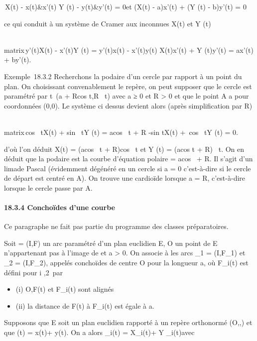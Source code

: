 \documentclass[]{article}
\begin{document}
\left
\matrix\,X(t) - x(t)&x'(t)
\cr Y (t) - y(t)&y'(t)\right 
= 0\text et (X(t) - a)x'(t) + (Y (t) - b)y'(t) = 0

ce qui conduit à un système de Cramer aux inconnues X(t) et Y (t)

\left
\\matrix\,y'(t)X(t) -
x'(t)Y (t) = y'(t)x(t) - x'(t)y(t) \cr X(t)x'(t) + Y
(t)y'(t) = ax'(t) + by'(t)\right .

Exemple~18.3.2 Recherchons la podaire d'un cercle par rapport à un point
du plan. On choisissant convenablement le repère, on peut supposer que
le cercle est paramétré par t\mapsto~(a +
Rcos t,R\sin~ t) avec
a ≥ 0 et R > 0 et que le point A a pour coordonnées (0,0).
Le système ci dessus devient alors (après simplification par R)

\left
\\matrix\,cos~
tX(t) + sin~ tY (t) =
acos~ t + R \cr
-sin tX(t) +\ cos~ tY
(t) = 0\right .

d'où l'on déduit X(t) = (acos~ t +
R)cos~ t et Y (t) =
(acos t + R)\sin~ t.
On en déduit que la podaire est la courbe d'équation polaire \rho =
acos~ \theta + R. Il s'agit d'un
lima\ccon de Pascal (évidemment dégénéré en un cercle
si a = 0 c'est-à-dire si le cercle de départ est centré en A). On trouve
une cardioïde lorsque a = R, c'est-à-dire lorsque le cercle passe par A.

\paragraph{18.3.4 Conchoïdes d'une courbe}

Ce paragraphe ne fait pas partie du programme des classes préparatoires.

Soit \Gamma = (I,F) un arc paramétré d'un plan euclidien E, O un point de E
n'appartenant pas à l'image de \Gamma et a > 0. On associe à \Gamma
les arcs \Gamma_1 = (I,F_1) et \Gamma_2 =
(I,F_2), appelés conchoïdes de centre O pour la longueur a, où
F_i(t) est défini pour i
\in\1,2\ par

\begin{itemize}
\itemsep1pt\parskip0pt
\item
  (i) O,F(t) et F_i(t) sont alignés
\item
  (ii) la distance de F(t) à F_i(t) est égale à a.
\end{itemize}

Supposons que E soit un plan euclidien rapporté à un repère orthonormé
(O,\vec\imath,) et que
\overrightarrowOF(t) = x(t)\vec\imath +
y(t). On a alors
\overrightarrowOF_i(t) =
X_i(t)\vec\imath + Y
_i(t) avec
\end{document}
